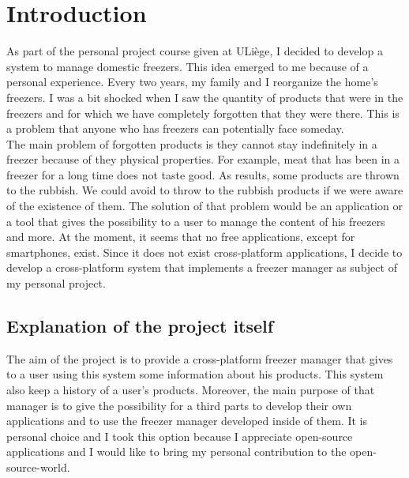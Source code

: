 \section{Introduction}
As part of the personal project course given at ULiège, I decided to develop a system to manage domestic freezers. This idea emerged to me because of a personal experience. Every two years, my family and I reorganize the home's freezers. I was a bit shocked when I saw the quantity of products that were in the freezers and for which we have completely forgotten that they were there. This is a problem that anyone who has freezers can potentially face someday. \\

The main problem of forgotten products is they cannot stay indefinitely in a freezer because of they physical properties. For example, meat that has been in a freezer for a long time does not taste good. As results, some products are thrown to the rubbish. We could avoid to throw to the rubbish products if we were aware of the existence of them. The solution of that problem would be an application or a tool that gives the possibility to a user to manage the content of his freezers and more. At the moment, it seems that no free applications, except for smartphones, exist. Since it does not exist cross-platform applications, I decide to develop a cross-platform system that implements a freezer manager as subject of my personal project.

\subsection{Explanation of the project itself}
The aim of the project is to provide a cross-platform freezer manager that gives to a user using this system some information about his products. This system also keep a history of a user's products. Moreover, the main purpose of that manager is to give the possibility for a third parts to develop their own applications and to use the freezer manager developed inside of them. It is personal choice and I took this option because I appreciate open-source applications and I would like to bring my personal contribution to the open-source-world. \\

